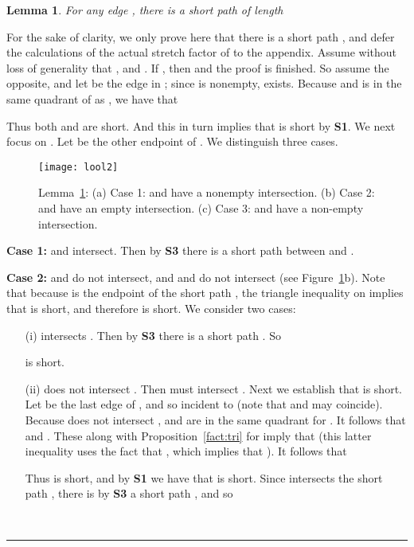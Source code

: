 \pdfoutput=1  \documentclass[11pt]{article}
\newtheorem{lemma}{Lemma}
\newcommand{\qed}{\rule{0.5em}{1.5ex}}
\newcommand{\fqed}{{\hfill~\qed}}
\newenvironment{proof}{{\noindent \bf Proof.}}
                      {{\hfill \fqed} \vspace{1em}}
\begin{document}
\begin{lemma}
For any edge , there is a short path  of length

\label{lem:lool2short}
\end{lemma}
\begin{proof}
For the sake of clarity, we only prove here that there is a short path , and defer
the calculations of the actual stretch factor of  to the appendix.
Assume without loss of generality that , and
. If , then 
and the proof is finished. So assume the opposite, and let
 be the edge in ; since  is nonempty,
 exists.
Because  and  is in the same quadrant of 
as , we have that

Thus both  and  are short.
And this in turn implies that  is short by {\bf S1}.
We next focus on .
Let  be the other endpoint of .
We distinguish three cases.

\begin{figure}[hp]
\centering
\texttt{[image: lool2]}
\caption{Lemma~\ref{lem:lool2short}: (a) Case 1:  and  have a nonempty intersection.
(b) Case 2:  and  have an empty intersection.
(c) Case 3:  and  have a non-empty intersection.}
\label{fig:lool2}
\end{figure}


\noindent
{\bf Case 1:}  and  intersect.
Then by {\bf S3} there is a short path  between  and .

\medskip
\noindent
{\bf Case 2:}  and  do not intersect,
and  and  do not intersect (see Figure~\ref{fig:lool2}b).
Note that because  is
the endpoint of the short path , the triangle inequality on 
implies that  is short, and therefore
 is short. We consider two cases:
\begin{enumerate}
\item[(i)]  intersects .
Then by {\bf S3} there is a short path .
So

is short.

\item[(ii)]  does not intersect .
Then  must intersect
.
Next we establish that  is short. Let  be the last edge
of , and so incident to 
(note that  and  may coincide). Because  does not intersect
,  and  are in the same quadrant for . It follows that
 and .
These along with
Proposition~\ref{fact:tri}
for  imply that
 (this latter inequality
uses the fact that , which implies that ).
It follows that

Thus  is short, and by {\bf S1} we have that  is short.
Since  intersects the short path
,
there is by {\bf S3} a short path , and so


\end{enumerate}
\end{proof}
\end{document}
